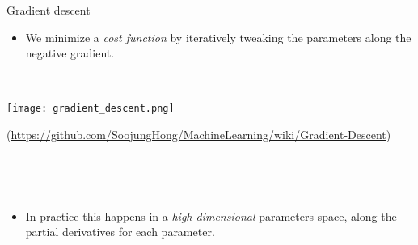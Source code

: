 \documentclass[
  10pt,
  ignorenonframetext,
  twocolumn]{beamer}
\providecommand{\tightlist}{%
  \setlength{\itemsep}{0pt}\setlength{\parskip}{0pt}}
\begin{document}
\begin{frame}
\begin{block}{Gradient descent}
\label{gradient-descent}
\(~\)

\begin{itemize}
\tightlist
\item
  We minimize a \emph{cost function} by iteratively tweaking the
  parameters along the negative gradient.
\end{itemize}

\(~\)

\center

\texttt{[image: gradient\_descent.png]}

\tiny (\url{https://github.com/SoojungHong/MachineLearning/wiki/Gradient-Descent})

\(~\)

\(~\)

\normalsize
\flushleft

\begin{itemize}
\tightlist
\item
  In practice this happens in a \emph{high-dimensional} parameters
  space, along the partial derivatives for each parameter.
\end{itemize}
\end{block}
\end{frame}
\end{document}
